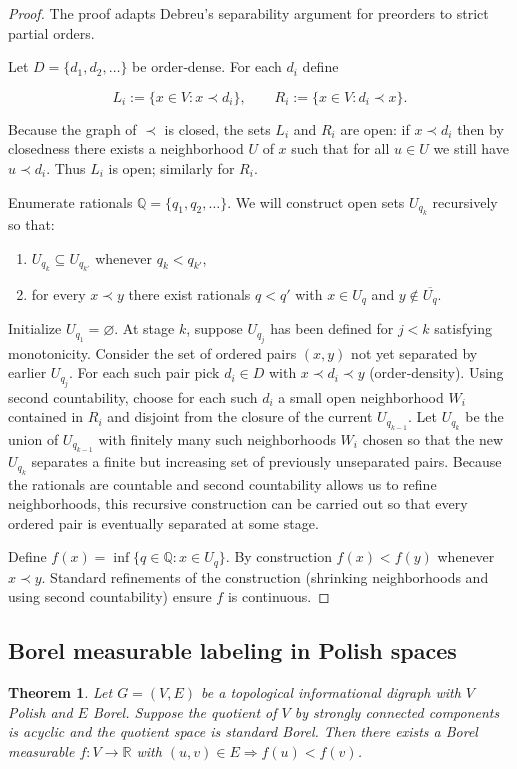 \documentclass[11pt]{article}
\newtheorem{theorem}[definition]{Theorem}
\begin{document}
\begin{proof}
The proof adapts Debreu's separability argument for preorders to strict
partial orders.

Let $D=\{d_1,d_2,\dots\}$ be order‑dense. For each $d_i$ define


\[
L_i:=\{x\in V: x\prec d_i\},\qquad R_i:=\{x\in V: d_i\prec x\}.
\]


Because the graph of $\prec$ is closed, the sets $L_i$ and $R_i$ are
open: if $x\prec d_i$ then by closedness there exists a neighborhood $U$
of $x$ such that for all $u\in U$ we still have $u\prec d_i$. Thus $L_i$
is open; similarly for $R_i$.

Enumerate rationals $\mathbb Q=\{q_1,q_2,\dots\}$. We will construct open
sets $U_{q_k}$ recursively so that:
\begin{enumerate}[label=(\roman*)]
  \item $U_{q_k}\subseteq U_{q_{k'}}$ whenever $q_k<q_{k'}$,
  \item for every $x\prec y$ there exist rationals $q<q'$ with $x\in U_q$
    and $y\notin\overline{U_q}$.
\end{enumerate}

Initialize $U_{q_1}=\varnothing$. At stage $k$, suppose $U_{q_j}$ has been
defined for $j<k$ satisfying monotonicity. Consider the set of ordered
pairs $(x,y)$ not yet separated by earlier $U_{q_j}$. For each such pair
pick $d_i\in D$ with $x\prec d_i\prec y$ (order‑density). Using second
countability, choose for each such $d_i$ a small open neighborhood $W_i$
contained in $R_i$ and disjoint from the closure of the current
$U_{q_{k-1}}$. Let $U_{q_k}$ be the union of $U_{q_{k-1}}$ with finitely
many such neighborhoods $W_i$ chosen so that the new $U_{q_k}$ separates
a finite but increasing set of previously unseparated pairs. Because the
rationals are countable and second countability allows us to refine
neighborhoods, this recursive construction can be carried out so that
every ordered pair is eventually separated at some stage.

Define $f(x)=\inf\{q\in\mathbb Q: x\in U_q\}$. By construction $f(x)<f(y)$
whenever $x\prec y$. Standard refinements of the construction (shrinking
neighborhoods and using second countability) ensure $f$ is continuous.
\end{proof}

\subsection*{Borel measurable labeling in Polish spaces}
\begin{theorem}
Let $G=(V,E)$ be a topological informational digraph with $V$ Polish and
$E$ Borel. Suppose the quotient of $V$ by strongly connected components
is acyclic and the quotient space is standard Borel. Then there exists a
Borel measurable $f:V\to\mathbb R$ with $(u,v)\in E\Rightarrow f(u)<f(v)$.
\end{theorem}
\end{document}
